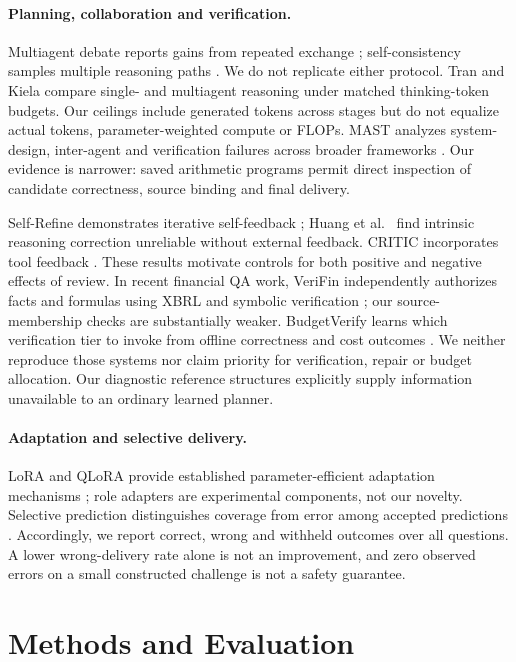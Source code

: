 \documentclass[10pt,letterpaper]{article}
\begin{document}
\paragraph{Planning, collaboration and verification.}
Multiagent debate reports gains from repeated exchange \citep{debate}; self-consistency samples multiple reasoning paths \citep{selfconsistency}. We do not replicate either protocol. Tran and Kiela \citep{equalbudget} compare single- and multiagent reasoning under matched thinking-token budgets. Our ceilings include generated tokens across stages but do not equalize actual tokens, parameter-weighted compute or FLOPs. MAST analyzes system-design, inter-agent and verification failures across broader frameworks \citep{mast}. Our evidence is narrower: saved arithmetic programs permit direct inspection of candidate correctness, source binding and final delivery.

Self-Refine demonstrates iterative self-feedback \citep{selfrefine}; Huang et al.\ \citep{selfcorrect} find intrinsic reasoning correction unreliable without external feedback. CRITIC incorporates tool feedback \citep{critic}. These results motivate controls for both positive and negative effects of review. In recent financial QA work, VeriFin independently authorizes facts and formulas using XBRL and symbolic verification \citep{verifin}; our source-membership checks are substantially weaker. BudgetVerify learns which verification tier to invoke from offline correctness and cost outcomes \citep{budgetverify}. We neither reproduce those systems nor claim priority for verification, repair or budget allocation. Our diagnostic reference structures explicitly supply information unavailable to an ordinary learned planner.

\paragraph{Adaptation and selective delivery.}
LoRA and QLoRA provide established parameter-efficient adaptation mechanisms \citep{lora,qlora}; role adapters are experimental components, not our novelty. Selective prediction distinguishes coverage from error among accepted predictions \citep{selective}. Accordingly, we report correct, wrong and withheld outcomes over all questions. A lower wrong-delivery rate alone is not an improvement, and zero observed errors on a small constructed challenge is not a safety guarantee.

\section{Methods and Evaluation}
\end{document}
